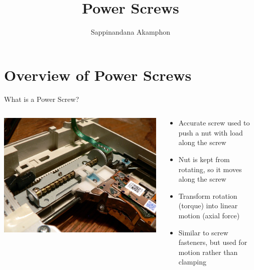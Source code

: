 \documentclass[10pt, svgnames]{beamer}
\author{Sappinandana Akamphon}
\date{}
\title{Power Screws}
\institute{Department of Mechanical Engineering, TSE}
\begin{document}
\maketitle

\section{Overview of Power Screws}
\label{sec:org6825514}

\begin{frame}[label={sec:org43b97c1}]{What is a Power Screw?}
\begin{columns}
\begin{column}{0.5\columnwidth}
\begin{center}
\includegraphics[width=.9\linewidth]{pictures/dvd-drive-screw.jpg}
\end{center}
\end{column}

\begin{column}{0.5\columnwidth}
\begin{itemize}
\item Accurate screw used to push a nut with load along the screw

\item Nut is kept from rotating, so it moves along the screw

\item Transform rotation (torque) into linear motion (axial force)

\item Similar to screw fasteners, but used for motion rather than clamping
\end{itemize}
\end{column}
\end{columns}
\end{frame}
\end{document}
